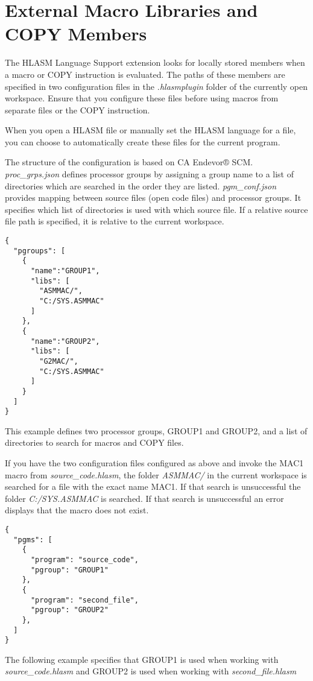 \section{External Macro Libraries and COPY Members}
\label{sec:configuration}

The HLASM Language Support extension looks for locally stored members when a macro or COPY instruction is evaluated. The paths of these members are specified in two configuration files in the \emph{.hlasmplugin} folder of the currently open workspace. Ensure that you configure these files before using macros from separate files or the COPY instruction.

When you open a HLASM file or manually set the HLASM language for a file, you can choose to automatically create these files for the current program.

The structure of the configuration is based on CA Endevor® SCM. \emph{proc\_grps.json} defines processor groups by assigning a group name to a list of directories which are searched in the order they are listed. \emph{pgm\_conf.json} provides mapping between source files (open code files) and processor groups. It specifies which list of directories is used with which source file. If a relative source file path is specified, it is relative to the current workspace.

\begin{listing}[H]
	\begin{verbatim}
{
  "pgroups": [
    {
      "name":"GROUP1",
      "libs": [
        "ASMMAC/",
        "C:/SYS.ASMMAC"
      ]
    },
    {
      "name":"GROUP2",
      "libs": [
        "G2MAC/",
        "C:/SYS.ASMMAC"
      ]
    }
  ]
}
	\end{verbatim}
	\caption{This example defines two processor groups, GROUP1 and GROUP2, and a list of directories to search for macros and COPY files.}
\end{listing}

If you have the two configuration files configured as above and invoke the MAC1 macro from \emph{source\_code.hlasm}, the folder \emph{ASMMAC/} in the current workspace is searched for a file with the exact name MAC1. If that search is unsuccessful the folder \emph{C:/SYS.ASMMAC} is searched. If that search is unsuccessful an error displays that the macro does not exist.

\begin{listing}[H]
	\begin{verbatim}
{
  "pgms": [
    {
      "program": "source_code",
      "pgroup": "GROUP1"
    },
    {
      "program": "second_file",
      "pgroup": "GROUP2"
    },
  ]
}
	\end{verbatim}
	\caption{The following example specifies that GROUP1 is used when working with \emph{source\_code.hlasm} and GROUP2 is used when working with \emph{second\_file.hlasm}}
\end{listing}

